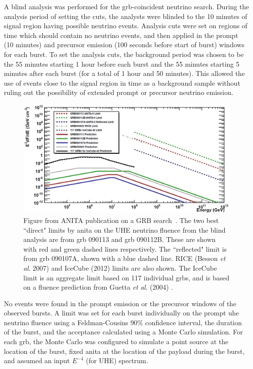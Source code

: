 A blind analysis was performed for the \gls{grb}-coincident neutrino search. During the analysis period of setting the cuts, the analysts were blinded to the 10 minutes of signal region having possible neutrino events. Analysis cuts were set on regions of time which should contain no neutrino events, and then applied in the prompt (10 minutes) and precursor emission (100 seconds before start of burst) windows for each burst. To set the analysis cuts, the background period was chosen to be the 55 minutes starting 1 hour before each burst and the 55 minutes starting 5 minutes after each burst (for a total of 1 hour and 50 minutes). This allowed the use of events close to the signal region in time as a background sample without ruling out the possibility of extended prompt or precursor neutrino emission. 

\begin{figure}
\centering
\includegraphics[width=1.0\textwidth]{figures/anitaresult.PNG}
\caption{Figure from ANITA publication on a GRB search~\cite{anita_grb}. The two best ``direct" limits by \gls{anita} on the UHE neutrino fluence from the blind analysis are from \gls{grb} 090113 and \gls{grb} 090112B. These are shown with red and green dashed lines respectively. The ``reflected" limit is from \gls{grb} 090107A, shown with a blue dashed line. RICE (Besson \textit{et al}. 2007) and IceCube (2012) \cite{IC2012} limits are also shown. The IceCube limit is an aggregate limit based on 117 individual \gls{grb}s, and is based on a fluence prediction from Guetta \textit{et al}. (2004) \cite{guetta,anita_grb}.}
\label{anitaresult}
\end{figure}

No events were found in the prompt emission or the precursor windows of the observed bursts. A limit was set for each burst individually on the prompt \gls{uhe} neutrino fluence using a Feldman-Cousins 90\% confidence interval, the duration of the burst, and the acceptance calculated using a Monte Carlo simulation. For each \gls{grb}, the Monte Carlo was configured to simulate a point source at the location of the burst, fixed \gls{anita} at the location of the payload during the burst, and assumed an input $E^{-4}$ (for UHE) spectrum.

